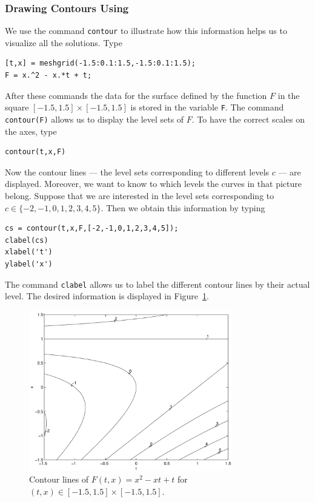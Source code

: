 \documentclass{ximera}
\begin{document}
\subsubsection*{Drawing Contours Using \Matlab}

We use the \Matlab command {\tt contour} to illustrate how this
information helps us to visualize all the solutions.  Type
\begin{verbatim}
[t,x] = meshgrid(-1.5:0.1:1.5,-1.5:0.1:1.5);
F = x.^2 - x.*t + t;
\end{verbatim}
After these commands the data for the surface defined by the
function $F$ in the square $[-1.5,1.5]\times [-1.5,1.5]$ is
stored in the \Matlab variable {\tt F}.  The command {\tt
contour(F)} allows us to display 
the level sets of $F$.  To have
the correct scales on the axes, type
\begin{verbatim}
contour(t,x,F)
\end{verbatim}
Now the contour lines --- the level sets corresponding to
different levels $c$ --- are displayed.  Moreover, we want to know to which 
levels the curves in that picture belong.  Suppose that we are interested in 
the level sets corresponding to $c\in\{ -2,-1,0,1,2,3,4,5\}$.  Then we 
obtain this information by typing
\begin{verbatim}
cs = contour(t,x,F,[-2,-1,0,1,2,3,4,5]);
clabel(cs)
xlabel('t')
ylabel('x')
\end{verbatim}
The command {\tt clabel} allows us to label the different
contour lines by their actual level.  The desired
information is displayed in Figure~\ref{Fig:contour1}.

\begin{figure}[htb]
           \centerline{%
           \includegraphics[width=3.5in]{../figures/contour1.pdf}}
           \caption{Contour lines of $F(t,x)=x^2-xt+t$ for
          $(t,x)\in[-1.5,1.5]\times[-1.5,1.5]$.}
           \label{Fig:contour1}
\end{figure}
\end{document}
